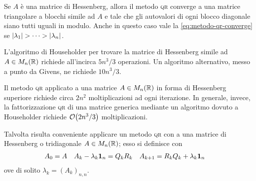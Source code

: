 	Se \(A\) è una matrice di Hessenberg, allora il metodo \textsc{qr} converge a una matrice triangolare a blocchi simile ad \(A\) e tale che gli autovalori di ogni blocco diagonale siano tutti uguali in modulo. Anche in questo caso vale la \eqref{eq:metodo-qr-converge} se \(\abs{\lambda_1} > \dots > \abs{\lambda_n}\).
	
	\begin{osservazione}
		L'algoritmo di Householder per trovare la matrice di Hessenberg simile ad \(A \in M_n (\mathbb{R})\) richiede all'incirca \(5 n^3 / 3\) operazioni. Un algoritmo alternativo, messo a punto da Givens, ne richiede \(10 n^3 / 3\).
		
		Il metodo \textsc{qr} applicato a una matrice \(A \in M_n (\mathbb{R})\) in forma di Hessenberg superiore richiede circa \(2 n^2\) moltiplicazioni ad ogni iterazione. In generale, invece, la fattorizzazione \textsc{qr} di una matrice generica mediante un algoritmo dovuto a Householder richiede \(\order{2 n^3 / 3}\) moltiplicazioni.
	\end{osservazione}

	\begin{nota}
		Talvolta risulta conveniente applicare un metodo \textsc{qr} con  a una matrice di Hessenberg o tridiagonale \(A \in M_n (\mathbb{R})\); esso si definisce con
		\begin{align*}
			A_0 &= A &
			A_k - \lambda_k \mathbf{1}_n &= Q_k R_k &
			A_{k + 1} &= R_k Q_k + \lambda_k \mathbf{1}_n
		\end{align*}
		ove di solito \(\lambda_k = (A_k)_{n, n}\).
	\end{nota}